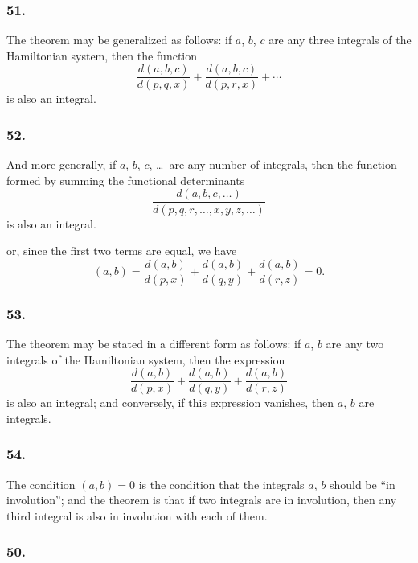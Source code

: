 \documentclass[11pt,a4paper]{book}
\begin{document}
\subsubsection*{51.}

The theorem may be generalized as follows: if $a$, $b$, $c$ are any three integrals of the Hamiltonian system, then the function
\[
\frac{d(a, b, c)}{d(p, q, x)} + \frac{d(a, b, c)}{d(p, r, x)} + \cdots
\]
is also an integral.

\subsubsection*{52.}

And more generally, if $a$, $b$, $c$, \ldots\ are any number of integrals, then the function formed by summing the functional determinants
\[
\frac{d(a, b, c, \ldots)}{d(p, q, r, \ldots, x, y, z, \ldots)}
\]
is also an integral.

\newpage
\setcounter{page}{134}

or, since the first two terms are equal, we have
\[
(a, b) = \frac{d(a, b)}{d(p, x)} + \frac{d(a, b)}{d(q, y)} + \frac{d(a, b)}{d(r, z)} = 0.
\]

\subsubsection*{53.}

The theorem may be stated in a different form as follows: if $a$, $b$ are any two integrals of the Hamiltonian system, then the expression
\[
\frac{d(a, b)}{d(p, x)} + \frac{d(a, b)}{d(q, y)} + \frac{d(a, b)}{d(r, z)}
\]
is also an integral; and conversely, if this expression vanishes, then $a$, $b$ are integrals.

\subsubsection*{54.}

The condition $(a, b) = 0$ is the condition that the integrals $a$, $b$ should be ``in involution''; and the theorem is that if two integrals are in involution, then any third integral is also in involution with each of them.

\newpage
\setcounter{page}{135}

\subsubsection*{50.}
\end{document}
